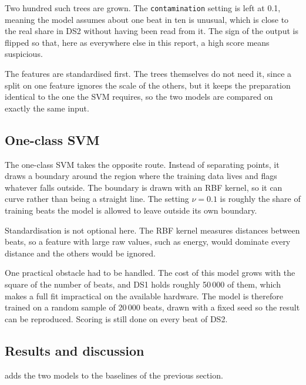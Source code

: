 \documentclass[a4paper, 12pt]{article}
\begin{document}
Two hundred such trees are grown. The \texttt{contamination} setting is left at
\num{0.1}, meaning the model assumes about one beat in ten is unusual, which is
close to the real share in DS2 without having been read from it. The sign of the
output is flipped so that, here as everywhere else in this report, a high score
means suspicious.

The features are standardised first. The trees themselves do not need it, since a
split on one feature ignores the scale of the others, but it keeps the preparation
identical to the one the SVM requires, so the two models are compared on exactly
the same input.

\subsection{One-class SVM} \label{subsec:ocsvm}

The one-class SVM takes the opposite route. Instead of separating points, it draws
a boundary around the region where the training data lives and flags whatever
falls outside. The boundary is drawn with an RBF kernel, so it can curve rather
than being a straight line. The setting $\nu = 0.1$ is roughly the share of
training beats the model is allowed to leave outside its own boundary.

Standardisation is not optional here. The RBF kernel measures distances between
beats, so a feature with large raw values, such as energy, would dominate every
distance and the others would be ignored.

One practical obstacle had to be handled. The cost of this model grows with the
square of the number of beats, and DS1 holds roughly 50\,000 of them, which makes
a full fit impractical on the available hardware. The model is therefore trained
on a random sample of 20\,000 beats, drawn with a fixed seed so the result can be
reproduced. Scoring is still done on every beat of DS2.

\subsection{Results and discussion} \label{subsec:unsupresults}

 adds the two models to the baselines of the previous
section.
\end{document}
